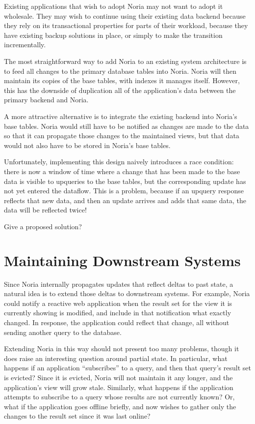 Existing applications that wish to adopt Noria may not want to adopt it
wholesale. They may wish to continue using their existing data backend because
they rely on its transactional properties for parts of their workload, because
they have existing backup solutions in place, or simply to make the transition
incrementally.

The most straightforward way to add Noria to an existing system architecture is
to feed all changes to the primary database tables into Noria. Noria will then
maintain its copies of the base tables, with indexes it manages itself. However,
this has the downside of duplication all of the application's data between the
primary backend and Noria.

A more attractive alternative is to integrate the existing backend into Noria's
base tables. Noria would still have to be notified as changes are made to the
data so that it can propagate those changes to the maintained views, but that
data would not also have to be stored in Noria's base tables.

Unfortunately, implementing this design naively introduces a race condition:
there is now a window of time where a change that has been made to the base data
is visible to upqueries to the base tables, but the corresponding update has not
yet entered the dataflow. This is a problem, because if an upquery response
reflects that new data, and then an update arrives and adds that same data, the
data will be reflected twice!

\begin{inprogress}
  Give a proposed solution?
\end{inprogress}

\section{Maintaining Downstream Systems}

Since Noria internally propagates updates that reflect deltas to past state, a
natural idea is to extend those deltas to downstream systems. For example, Noria
could notify a reactive web application when the result set for the view it is
currently showing is modified, and include in that notification what exactly
changed. In response, the application could reflect that change, all without
sending another query to the database.

Extending Noria in this way should not present too many problems, though it does
raise an interesting question around partial state. In particular, what happens
if an application ``subscribes'' to a query, and then that query's result set is
evicted? Since it is evicted, Noria will not maintain it any longer, and the
application's view will grow stale. Similarly, what happens if the application
attempts to subscribe to a query whose results are not currently known? Or, what
if the application goes offline briefly, and now wishes to gather only the
changes to the result set since it was last online?

